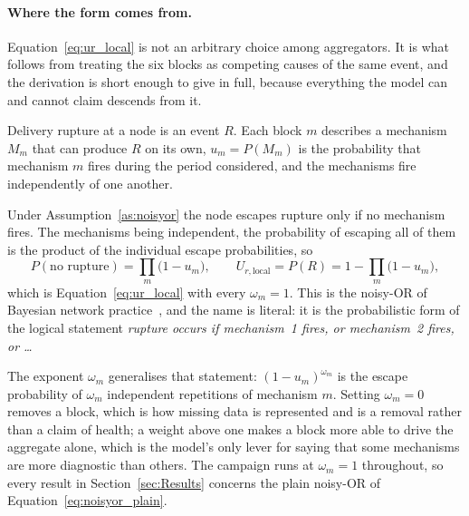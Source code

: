 \paragraph{Where the form comes from.}
Equation~\ref{eq:ur_local} is not an arbitrary choice among aggregators. It is what follows
from treating the six blocks as competing causes of the same event, and the derivation is
short enough to give in full, because everything the model can and cannot claim descends
from it.

\begin{assumption}
\label{as:noisyor}
Delivery rupture at a node is an event $R$. Each block $m$ describes a mechanism $M_m$ that
can produce $R$ on its own, $u_m = P(M_m)$ is the probability that mechanism $m$ fires
during the period considered, and the mechanisms fire independently of one another.
\end{assumption}

Under Assumption~\ref{as:noisyor} the node escapes rupture only if no mechanism fires. The
mechanisms being independent, the probability of escaping all of them is the product of the
individual escape probabilities, so
\begin{equation}
    P(\text{no rupture}) = \prod_m \bigl(1 - u_m\bigr),
    \qquad
    U_{r,\text{local}} = P(R) = 1 - \prod_m \bigl(1 - u_m\bigr),
    \label{eq:noisyor_plain}
\end{equation}
which is Equation~\ref{eq:ur_local} with every $\omega_m = 1$. This is the noisy-OR of
Bayesian network practice~\autocite{pearl1988probabilistic}, and the name is literal: it is
the probabilistic form of the logical statement \emph{rupture occurs if mechanism~1 fires,
or mechanism~2 fires, or \ldots}

The exponent $\omega_m$ generalises that statement: $(1-u_m)^{\omega_m}$ is the escape
probability of $\omega_m$ independent repetitions of mechanism $m$. Setting $\omega_m = 0$
removes a block, which is how missing data is represented and is a removal rather than a
claim of health; a weight above one makes a block more able to drive the aggregate alone,
which is the model's only lever for saying that some mechanisms are more diagnostic than
others. The campaign runs at $\omega_m = 1$ throughout, so every result in
Section~\ref{sec:Results} concerns the plain noisy-OR of Equation~\ref{eq:noisyor_plain}.

